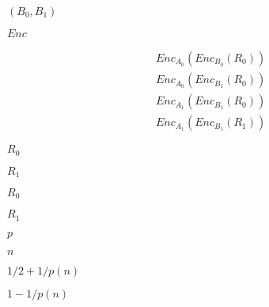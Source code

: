\documentclass[10pt]{book}
\begin{document}
\begin{mdSnippets}
\begin{mdInlineSnippet}%
$(B_{0}, B_{1})$\end{mdInlineSnippet}%
\begin{mdInlineSnippet}[c7d057b625028b0487cc3ef0d269fdd8]%
$Enc$\end{mdInlineSnippet}%
\begin{mdDisplaySnippet}[7f482d1d974c7d7530a2af938323d40d]%
\[%
\begin{aligned}
&Enc_{A_{0}}(Enc_{B_{0}}(R_{0})) \\
&Enc_{A_{0}}(Enc_{B_{1}}(R_{0})) \\
&Enc_{A_{1}}(Enc_{B_{1}}(R_{0})) \\
&Enc_{A_{1}}(Enc_{B_{1}}(R_{1}))
\end{aligned}
\]%
\end{mdDisplaySnippet}%
\begin{mdInlineSnippet}[8a826f776103126e610a820a56d5e102]%
$R_{0}$\end{mdInlineSnippet}%
\begin{mdInlineSnippet}[be473692ca1cbc48985e5e93af6755bf]%
$R_{1}$\end{mdInlineSnippet}%
\begin{mdInlineSnippet}[8a826f776103126e610a820a56d5e102]%
$R_{0}$\end{mdInlineSnippet}%
\begin{mdInlineSnippet}[be473692ca1cbc48985e5e93af6755bf]%
$R_{1}$\end{mdInlineSnippet}%
\begin{mdInlineSnippet}[83878c91171338902e0fe0fb97a8c47a]%
$p$\end{mdInlineSnippet}%
\begin{mdInlineSnippet}[7b8b965ad4bca0e41ab51de7b31363a1]%
$n$\end{mdInlineSnippet}%
\begin{mdInlineSnippet}[f244f691af09c4bc5fa958adfe648bc5]%
$1/2 + 1/p(n)$\end{mdInlineSnippet}%
\begin{mdInlineSnippet}%
$1 - 1/p(n)$\end{mdInlineSnippet}%
\begin{mdInlineSnippet}[48533ff3c80df83e90d753a7d171ef0f]%

\end{mdInlineSnippet}
\end{mdSnippets}
\end{document}
